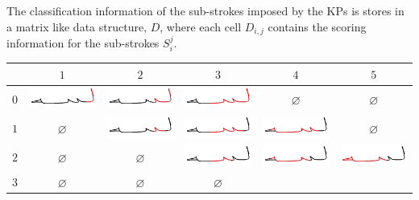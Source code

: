 \documentclass[a0paper,portrait]{baposter}
\begin{document}
\begin{poster}
{The classification information of the sub-strokes imposed by the KPs is stores in a matrix like data structure, $D$, where each cell $D_{i,j}$ contains the scoring information for the sub-strokes $S_i^j$. 

{\smaller
\begin{center}
\renewcommand{\arraystretch}{1.1}
\begin{tabular}{ c | c  c  c  c  c }
\toprule
     & $1$ & $2$ & $3$ & $4$ & $5$ \\
\midrule
$0$
   & \includegraphics[width=0.13\linewidth]{./figures/substrokes/L}
   & \includegraphics[width=0.13\linewidth]{./figures/substrokes/LB1}
   & \includegraphics[width=0.13\linewidth]{./figures/substrokes/LB1B2}
   & $\varnothing$ & $\varnothing$ \\
$1$
   & $\varnothing$
   & \includegraphics[width=0.13\linewidth]{./figures/substrokes/B1}
   & \includegraphics[width=0.13\linewidth]{./figures/substrokes/B1B2}
   & \includegraphics[width=0.13\linewidth]{./figures/substrokes/B1B2H1}
   & $\varnothing$ \\
$2$
   & $\varnothing$  & $\varnothing$
   & \includegraphics[width=0.13\linewidth]{./figures/substrokes/B2}
   & \includegraphics[width=0.13\linewidth]{./figures/substrokes/B2H1}
   & \includegraphics[width=0.13\linewidth]{./figures/substrokes/B2H} \\
$3$
   & $\varnothing$ & $\varnothing$ & $\varnothing$ 

\end{tabular}
\end{center}}}
\end{poster}
\end{document}
